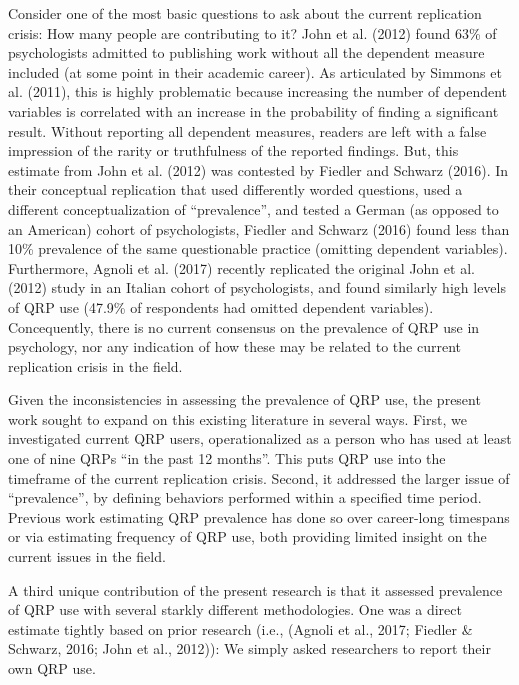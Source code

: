\documentclass[jou]{apa6}
\theoremstyle{definition}
\theoremstyle{definition}
\theoremstyle{definition}
\theoremstyle{remark}
\begin{document}
Consider one of the most basic questions to ask about the current
replication crisis: How many people are contributing to it? John et al.
(2012) found 63\% of psychologists admitted to publishing work without
all the dependent measure included (at some point in their academic
career). As articulated by Simmons et al. (2011), this is highly
problematic because increasing the number of dependent variables is
correlated with an increase in the probability of finding a significant
result. Without reporting all dependent measures, readers are left with
a false impression of the rarity or truthfulness of the reported
findings. But, this estimate from John et al. (2012) was contested by
Fiedler and Schwarz (2016). In their conceptual replication that used
differently worded questions, used a different conceptualization of
\enquote{prevalence}, and tested a German (as opposed to an American)
cohort of psychologists, Fiedler and Schwarz (2016) found less than 10\%
prevalence of the same questionable practice (omitting dependent
variables). Furthermore, Agnoli et al. (2017) recently replicated the
original John et al. (2012) study in an Italian cohort of psychologists,
and found similarly high levels of QRP use (47.9\% of respondents had
omitted dependent variables). Concequently, there is no current
consensus on the prevalence of QRP use in psychology, nor any indication
of how these may be related to the current replication crisis in the
field.

Given the inconsistencies in assessing the prevalence of QRP use, the
present work sought to expand on this existing literature in several
ways. First, we investigated current QRP users, operationalized as a
person who has used at least one of nine QRPs \enquote{in the past 12
months}. This puts QRP use into the timeframe of the current replication
crisis. Second, it addressed the larger issue of \enquote{prevalence},
by defining behaviors performed within a specified time period. Previous
work estimating QRP prevalence has done so over career-long timespans or
via estimating frequency of QRP use, both providing limited insight on
the current issues in the field.

A third unique contribution of the present research is that it assessed
prevalence of QRP use with several starkly different methodologies. One
was a direct estimate tightly based on prior research (i.e., (Agnoli et
al., 2017; Fiedler \& Schwarz, 2016; John et al., 2012)): We simply
asked researchers to report their own QRP use.
\end{document}
